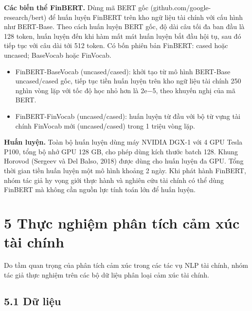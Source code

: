 \textbf{Các biến thể FinBERT.} Dùng mã BERT gốc (github.com/google-research/bert) để huấn luyện FinBERT trên kho ngữ liệu tài chính với cấu hình như BERT-Base. Theo cách huấn luyện BERT gốc, độ dài câu tối đa ban đầu là 128 token, huấn luyện đến khi hàm mất mát huấn luyện bắt đầu hội tụ, sau đó tiếp tục với câu dài tới 512 token. Có bốn phiên bản FinBERT: cased hoặc uncased; BaseVocab hoặc FinVocab.

\begin{itemize}
\item
  FinBERT-BaseVocab (uncased/cased): khởi tạo từ mô hình BERT-Base uncased/cased gốc, tiếp tục tiền huấn luyện trên kho ngữ liệu tài chính 250 nghìn vòng lặp với tốc độ học nhỏ hơn là 2e\ensuremath{-}5, theo khuyến nghị của mã BERT.
\item
  FinBERT-FinVocab (uncased/cased): huấn luyện từ đầu với bộ từ vựng tài chính FinVocab mới (uncased/cased) trong 1 triệu vòng lặp.
\end{itemize}

\textbf{Huấn luyện.} Toàn bộ huấn luyện dùng máy NVIDIA DGX-1 với 4 GPU Tesla P100, tổng bộ nhớ GPU 128 GB, cho phép dùng kích thước batch 128. Khung Horovod (Sergeev và Del Balso, 2018) được dùng cho huấn luyện đa GPU. Tổng thời gian tiền huấn luyện một mô hình khoảng 2 ngày. Khi phát hành FinBERT, nhóm tác giả hy vọng giới thực hành và nghiên cứu tài chính có thể dùng FinBERT mà không cần nguồn lực tính toán lớn để huấn luyện.

\section{5 Thực nghiệm phân tích cảm xúc tài chính}

Do tầm quan trọng của phân tích cảm xúc trong các tác vụ NLP tài chính, nhóm tác giả thực nghiệm trên các bộ dữ liệu phân loại cảm xúc tài chính.

\subsection{5.1 Dữ liệu}

